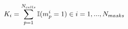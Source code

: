 \vspace{-0.1cm}
\begin{equation}
    K_i = \sum_{p = 1}^{N_{cells}} \mathbb{I}(m_p^i = 1) \in i = 1, ..., N_{masks}
    \label{eq:active_cells_mask}
    \vspace{-0.05cm}
\end{equation}